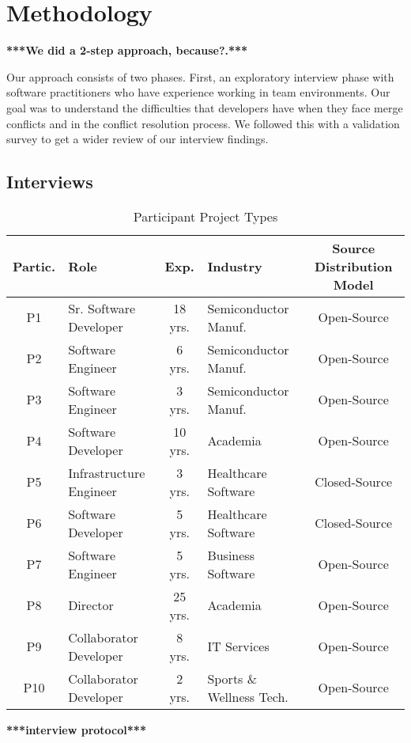\section{Methodology}\label{methodology}
\textbf{***We did a 2-step approach, because?.***}

Our approach consists of two phases. First, an exploratory interview phase with software practitioners who have experience working in team environments. Our goal was to understand the difficulties that developers have when they face merge conflicts and in the conflict resolution process. We followed this with a validation survey to get a wider review of our interview findings. 

\subsection{Interviews}
\begin{table*}[!t]
\renewcommand{\arraystretch}{1.3}
\caption{Participant Project Types}
\label{project_type}
\centering
\begin{tabular}{|c|l|c|l|c|}
	\hline
	Partic. & Role & Exp. & Industry & Source Distribution Model\\
	\hline
	P1 & Sr. Software Developer & 18 yrs. & Semiconductor Manuf. & Open-Source\\
	P2 & Software Engineer & 6 yrs. & Semiconductor Manuf. & Open-Source\\
	P3 & Software Engineer & 3 yrs. & Semiconductor Manuf. & Open-Source\\
	P4 & Software Developer & 10 yrs. & Academia & Open-Source\\
	P5 & Infrastructure Engineer & 3 yrs. & Healthcare Software & Closed-Source\\
	P6 & Software Developer & 5 yrs. & Healthcare Software & Closed-Source\\
	P7 & Software Engineer & 5 yrs. & Business Software & Open-Source\\
	P8 & Director & 25 yrs. & Academia & Open-Source\\
	P9 & Collaborator Developer & 8 yrs. & IT Services & Open-Source\\
	P10 & Collaborator Developer & 2 yrs. & Sports \& Wellness Tech. & Open-Source\\
	\hline
\end{tabular}
\end{table*}

\textbf{***interview protocol***}

